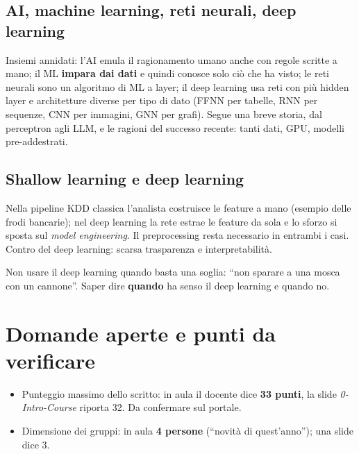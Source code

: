\subsection{AI, machine learning, reti neurali, deep learning}
Insiemi annidati: l'AI emula il ragionamento umano anche con regole scritte a mano; il ML
\textbf{impara dai dati} e quindi conosce solo ciò che ha visto; le reti neurali sono un algoritmo di
ML a layer; il deep learning usa reti con più hidden layer e architetture diverse per tipo di dato
(FFNN per tabelle, RNN per sequenze, CNN per immagini, GNN per grafi). Segue una breve storia, dal
perceptron agli LLM, e le ragioni del successo recente: tanti dati, GPU, modelli pre-addestrati.

\subsection{Shallow learning e deep learning}
Nella pipeline KDD classica l'analista costruisce le feature a mano (esempio delle frodi bancarie);
nel deep learning la rete estrae le feature da sola e lo sforzo si sposta sul \emph{model
engineering}. Il preprocessing resta necessario in entrambi i casi. Contro del deep learning:
scarsa trasparenza e interpretabilità.

\begin{esame}
Non usare il deep learning quando basta una soglia: ``non sparare a una mosca con un cannone''.
Saper dire \textbf{quando} ha senso il deep learning e quando no.
\end{esame}

\section{Domande aperte e punti da verificare}
\begin{verifica}
\begin{itemize}
  \item Punteggio massimo dello scritto: in aula il docente dice \textbf{33 punti}, la slide
    \emph{0-Intro-Course} riporta 32. Da confermare sul portale.
  \item Dimensione dei gruppi: in aula \textbf{4 persone} (``novità di quest'anno''); una slide dice 3.
\end{itemize}
\end{verifica}

